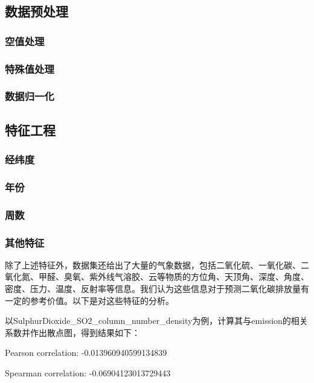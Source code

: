 \documentclass[fontset=windows]{article}
\begin{document}
\subsection{数据预处理}

\subsubsection{空值处理}

\subsubsection{特殊值处理}

\subsubsection{数据归一化}

\subsection{特征工程}

\subsubsection{经纬度}

\subsubsection{年份}

\subsubsection{周数}

\subsubsection{其他特征}

除了上述特征外，数据集还给出了大量的气象数据，包括二氧化硫、一氧化碳、二氧化氮、甲醛、臭氧、紫外线气溶胶、云等物质的方位角、天顶角、深度、角度、密度、压力、温度、反射率等信息。我们认为这些信息对于预测二氧化碳排放量有一定的参考价值。以下是对这些特征的分析。

以SulphurDioxide\_SO2\_column\_number\_density为例，计算其与emission的相关系数并作出散点图，得到结果如下：

\begin{center}
Pearson correlation: -0.013960940599134839

Spearman correlation: -0.06904123013729443
\end{center}
\end{document}
